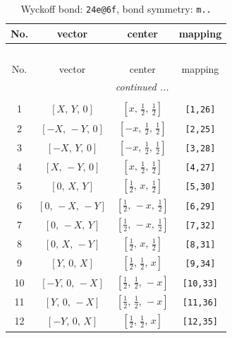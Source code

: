 \documentclass[fleqn,8pt]{jsarticle}
\begin{document}
\begin{longtable}{cccc}
\caption{Wyckoff bond: {\tt 24e@6f}, bond symmetry: {\tt m..}}
 \\
 \hline \hline
No. & vector & center & mapping \\ \hline \endfirsthead

\multicolumn{3}{l}{\tablename\ \thetable{}} \\
 \hline \hline
No. & vector & center & mapping \\ \hline \endhead

 \hline \hline
\multicolumn{3}{r}{\footnotesize\it continued ...} \\ \endfoot

 \hline \hline
\multicolumn{3}{r}{} \\ \endlastfoot

1 & $\left[ X,\, Y,\, 0 \right]$ & $\left[ x,\, \frac{1}{2},\, \frac{1}{2} \right]$ & {\tt [1,26]} \\ \hline
2 & $\left[ - X,\, - Y,\, 0 \right]$ & $\left[ - x,\, \frac{1}{2},\, \frac{1}{2} \right]$ & {\tt [2,25]} \\ \hline
3 & $\left[ - X,\, Y,\, 0 \right]$ & $\left[ - x,\, \frac{1}{2},\, \frac{1}{2} \right]$ & {\tt [3,28]} \\ \hline
4 & $\left[ X,\, - Y,\, 0 \right]$ & $\left[ x,\, \frac{1}{2},\, \frac{1}{2} \right]$ & {\tt [4,27]} \\ \hline
5 & $\left[ 0,\, X,\, Y \right]$ & $\left[ \frac{1}{2},\, x,\, \frac{1}{2} \right]$ & {\tt [5,30]} \\ \hline
6 & $\left[ 0,\, - X,\, - Y \right]$ & $\left[ \frac{1}{2},\, - x,\, \frac{1}{2} \right]$ & {\tt [6,29]} \\ \hline
7 & $\left[ 0,\, - X,\, Y \right]$ & $\left[ \frac{1}{2},\, - x,\, \frac{1}{2} \right]$ & {\tt [7,32]} \\ \hline
8 & $\left[ 0,\, X,\, - Y \right]$ & $\left[ \frac{1}{2},\, x,\, \frac{1}{2} \right]$ & {\tt [8,31]} \\ \hline
9 & $\left[ Y,\, 0,\, X \right]$ & $\left[ \frac{1}{2},\, \frac{1}{2},\, x \right]$ & {\tt [9,34]} \\ \hline
10 & $\left[ - Y,\, 0,\, - X \right]$ & $\left[ \frac{1}{2},\, \frac{1}{2},\, - x \right]$ & {\tt [10,33]} \\ \hline
11 & $\left[ Y,\, 0,\, - X \right]$ & $\left[ \frac{1}{2},\, \frac{1}{2},\, - x \right]$ & {\tt [11,36]} \\ \hline
12 & $\left[ - Y,\, 0,\, X \right]$ & $\left[ \frac{1}{2},\, \frac{1}{2},\, x \right]$ & {\tt [12,35]} \\ \hline

\end{longtable}
\end{document}
